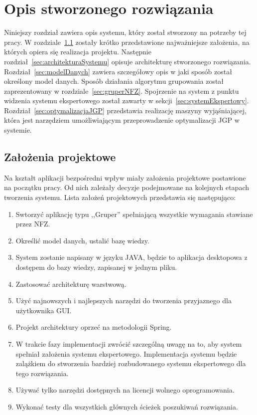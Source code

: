 \chapter{Opis stworzonego rozwiązania}
\label{cha:rozwiazanie}

Niniejszy rozdział zawiera opis systemu, który został stworzony na potrzeby tej pracy. W rozdziale~\ref{sec:zalozeniaProjektowe} zostały krótko przedstawione najważniejsze założenia, na których opiera się realizacja projektu. Następnie rozdział~\ref{sec:architekturaSystemu} opisuje architekturę stworzonego rozwiązania. Rozdział~\ref{sec:modelDanych} zawiera szczegółowy opis w jaki sposób został określony model danych. Sposób działania algorytmu grupowania został zaprezentowany w rozdziale~\ref{sec:gruperNFZ}. Spojrzenie na system z punktu widzenia systemu ekspertowego został zawarty w sekcji~\ref{sec:systemEkspertowy}. Rozdział~\ref{sec:optymalizacjaJGP} przedstawia realizację maszyny wyjąśniającej, która jest narzędziem umożliwiającym przeprowadzenie optymalizacji JGP w systemie.

\section{Założenia projektowe}
\label{sec:zalozeniaProjektowe}

Na kształt aplikacji bezpośredni wpływ miały założenia projektowe postawione na początku pracy. Od nich zależały decyzje podejmowane na kolejnych etapach tworzenia systemu. Lista założeń projektowych przedstawia się następująco:

\begin{enumerate}
 \item Swtorzyć aplikację typu ,,Gruper'' spełniającą wszystkie wymagania stawiane przez NFZ.
 \item Określić model danych, ustalić bazę wiedzy.
 \item System zostanie napisany w języku JAVA, będzie to aplikacja desktopowa z dostępem do bazy wiedzy, zapisanej w jednym pliku.
 \item Zastosować architekturę warstwową.
 \item Użyć najnowszych i najlepszych narzędzi do tworzenia przyjaznego dla użytkownika GUI.
 \item Projekt architektury oprzeć na metodologii Spring.
 \item W trakcie fazy implementacji zwrócić szczególną uwagę na to, aby system spełniał założenia systemu ekspertowego. Implementacja systemu będzie zalążkiem do stworzenia bardziej rozbudowanego systemu ekspertowego dla tego rozwiązania.
 \item Używać tylko narzędzi dostępnych na licencji wolnego oprogramowania.
 \item Wykonać testy dla wszystkich głównych ścieżek poszukiwań rozwiązania.
\end{enumerate}


